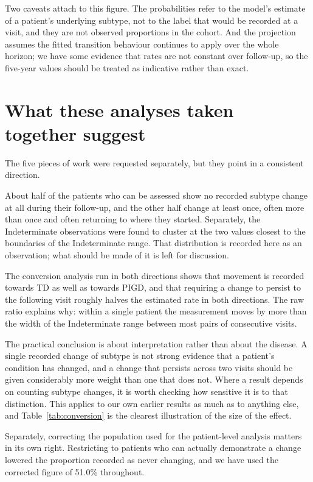 \documentclass[11pt,a4paper]{article}
\begin{document}
Two caveats attach to this figure. The probabilities refer to the model's
estimate of a patient's underlying subtype, not to the label that would be
recorded at a visit, and they are not observed proportions in the cohort. And the
projection assumes the fitted transition behaviour continues to apply over the
whole horizon; we have some evidence that rates are not constant over follow-up,
so the five-year values should be treated as indicative rather than exact.

\section{What these analyses taken together suggest}

The five pieces of work were requested separately, but they point in a
consistent direction.

About half of the patients who can be assessed show no recorded subtype change
at all during their follow-up, and the other half change at least once, often
more than once and often returning to where they started. Separately, the
Indeterminate observations were found to cluster at the two values closest to the
boundaries of the Indeterminate range. That distribution is recorded here as an
observation; what should be made of it is left for discussion.

The conversion analysis run in both directions shows that movement is recorded
towards TD as well as towards PIGD, and that requiring a change to persist to the
following visit roughly halves the estimated rate in both directions. The raw
ratio explains why: within a single patient the measurement moves by more than
the width of the Indeterminate range between most pairs of consecutive visits.

The practical conclusion is about interpretation rather than about the disease. A
single recorded change of subtype is not strong evidence that a patient's
condition has changed, and a change that persists across two visits should be
given considerably more weight than one that does not. Where a result depends on
counting subtype changes, it is worth checking how sensitive it is to that
distinction. This applies to our own earlier results as much as to anything else,
and Table~\ref{tab:conversion} is the clearest illustration of the size of the
effect.

Separately, correcting the population used for the patient-level analysis matters
in its own right. Restricting to patients who can actually demonstrate a change
lowered the proportion recorded as never changing, and we have used the corrected
figure of 51.0\% throughout.
\end{document}
